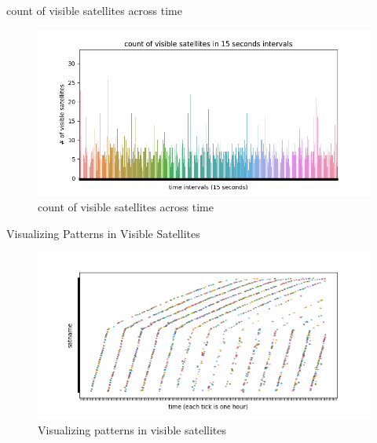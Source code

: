 \documentclass[NET,english,beameralt]{tumbeamer}
\begin{document}
\begin{frame}{count of visible satellites across time}
\begin{figure}
    \includegraphics[width=1\textwidth]{pics/count_visible_satellites.png}
    \caption[short]{count of visible satellites across time}
\end{figure}
\end{frame}

\begin{frame}{Visualizing Patterns in Visible Satellites}
\begin{figure}
    \includegraphics[width=1\textwidth]{pics/patterns-in-satellite-appearances.png}
    \caption[short]{Visualizing patterns in visible satellites}
\end{figure}
\end{frame}
\end{document}

